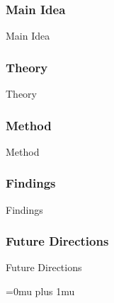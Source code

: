 \subsubsection{Main Idea}

\noindent
Main Idea

\subsubsection{Theory}

\noindent
Theory

\subsubsection{Method}

\noindent
Method

\subsubsection{Findings}

\noindent
Findings

\subsubsection{Future Directions}

\noindent
Future Directions 

\Urlmuskip=0mu plus 1mu\relax
\pagebreak